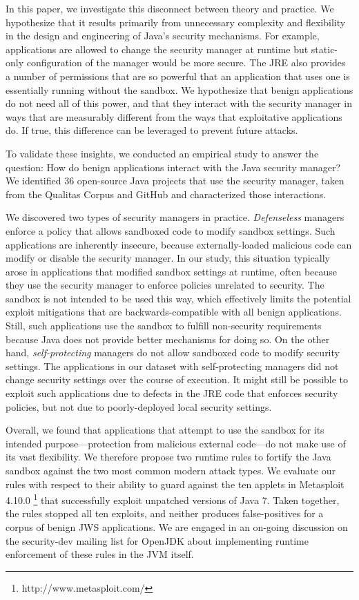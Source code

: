 \documentclass{sig-alternate}
\begin{document}
In this paper, we investigate this disconnect between theory and practice.  We
hypothesize that it results primarily from unnecessary complexity and flexibility
in the design and engineering of Java's security mechanisms.  For example,
applications are allowed to change the security manager at runtime but
static-only configuration of the manager would be more secure. The JRE also
provides a number of permissions that are so powerful that an application
that uses one is essentially running without the sandbox. We 
hypothesize that benign applications do not need all of this power, and that
they interact with the security manager in ways
that are measurably different from the ways that exploitative applications do.  
If true, this difference can be leveraged to prevent future attacks.

To validate these insights, we conducted an empirical study
to answer the question: How do benign
applications interact with the Java security manager?  We identified 36
open-source Java projects that use the security manager, taken from the Qualitas
Corpus \cite{QualitasCorpus:APSEC:2010} and GitHub and characterized
those interactions.

We discovered two types of security managers in
practice. \emph{Defenseless} managers enforce a policy that allows sandboxed code
to modify sandbox settings. Such applications
are inherently insecure, because externally-loaded malicious code can
modify or disable the security manager. In our study, this situation typically
arose in applications that modified sandbox settings at runtime, often because
they use the security manager to enforce policies unrelated to security.
The sandbox is not intended to be used this way, 
which effectively limits the potential exploit mitigations that are
backwards-compatible with all benign applications. Still, such applications use the
sandbox to fulfill non-security requirements
because Java does not provide better mechanisms for doing so.  
On the other hand, \emph{self-protecting} managers do not allow sandboxed code to modify
security settings.  The applications in our dataset with self-protecting
managers did not change security 
settings over the course of execution.  It might still be possible to exploit
such applications due to defects in the JRE code that enforces security
policies, but not due to poorly-deployed local security settings.

Overall, we found that applications that attempt to use the sandbox for its intended
purpose---protection from malicious external code---do not make use of its
vast flexibility.  We therefore propose two runtime rules to fortify the Java
sandbox against the two most common modern attack types. We evaluate our rules
with respect to their ability to guard against the ten applets in Metasploit
4.10.0%
\footnote{http://www.metasploit.com/} that successfully exploit unpatched versions of Java 7. Taken together, the rules stopped all ten exploits, and neither produces
false-positives for a corpus of benign JWS applications.
We are engaged in an
on-going discussion on the security-dev mailing list for OpenJDK about
implementing runtime enforcement of these rules in the JVM itself.
\end{document}
